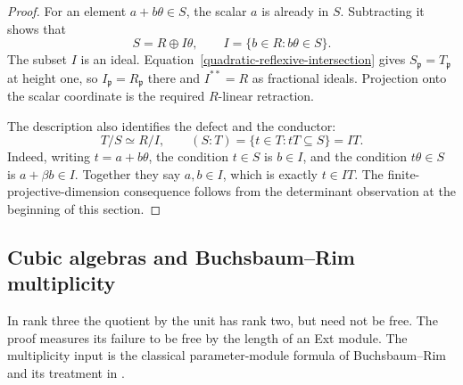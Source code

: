 \begin{proof}
For an element $a+b\theta\in S$, the scalar $a$ is already in $S$.
Subtracting it shows that
\[
 S=R\oplus I\theta,
 \qquad I=\{b\in R:b\theta\in S\}.
\]
The subset $I$ is an ideal.  Equation~\eqref{quadratic-reflexive-intersection}
gives $S_{\mathfrak p}=T_{\mathfrak p}$ at height one, so
$I_{\mathfrak p}=R_{\mathfrak p}$ there and $I^{**}=R$ as fractional
ideals.  Projection onto the scalar coordinate is the required
$R$-linear retraction.

The description also identifies the defect and the conductor:
\begin{equation}\label{quadratic-conductor}
 T/S\simeq R/I,
 \qquad (S:T)=\{t\in T:tT\subseteq S\}=IT.
\end{equation}
Indeed, writing $t=a+b\theta$, the condition $t\in S$ is $b\in I$,
and the condition $t\theta\in S$ is $a+\beta b\in I$.
Together they say $a,b\in I$, which is exactly $t\in IT$.
The finite-projective-dimension consequence follows from the
determinant observation at the beginning of this section.
\end{proof}

\subsection{Cubic algebras and Buchsbaum--Rim multiplicity}
In rank three the quotient by the unit has rank two, but need not
be free.  The proof measures its failure to be free by the length
of an Ext module.  The multiplicity input is the classical
parameter-module formula of Buchsbaum--Rim and its treatment in
\cite{BR,HH}.

